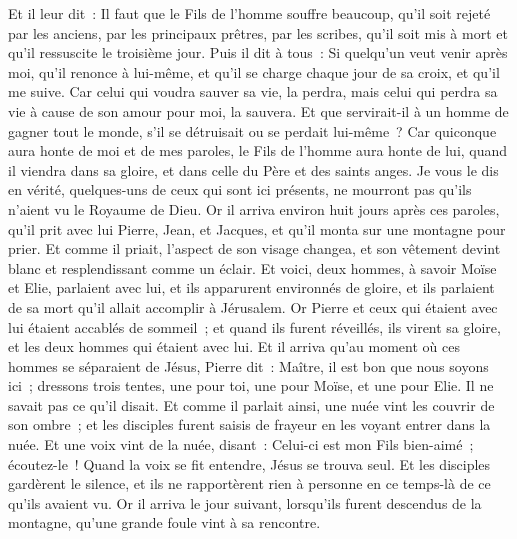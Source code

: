 \begin{multicols}{2}
Et il leur dit~: Il faut que le Fils de l'homme souffre beaucoup, qu'il soit rejeté par les anciens, par les principaux prêtres, par les scribes, qu'il soit mis à mort et qu'il ressuscite le troisième jour.
Puis il dit à tous~: Si quelqu'un veut venir après moi, qu'il renonce à lui-même, et qu'il se charge chaque jour de sa croix, et qu'il me suive.
Car celui qui voudra sauver sa vie, la perdra, mais celui qui perdra sa vie à cause de son amour pour moi, la sauvera.
Et que servirait-il à un homme de gagner tout le monde, s'il se détruisait ou se perdait lui-même~?
Car quiconque aura honte de moi et de mes paroles, le Fils de l'homme aura honte de lui, quand il viendra dans sa gloire, et dans celle du Père et des saints anges.
Je vous le dis en vérité, quelques-uns de ceux qui sont ici présents, ne mourront pas qu'ils n'aient vu le Royaume de Dieu.
Or il arriva environ huit jours après ces paroles, qu'il prit avec lui Pierre, Jean, et Jacques, et qu'il monta sur une montagne pour prier.
Et comme il priait, l'aspect de son visage changea, et son vêtement devint blanc et resplendissant comme un éclair.
Et voici, deux hommes, à savoir Moïse et Elie, parlaient avec lui,
et ils apparurent environnés de gloire, et ils parlaient de sa mort qu'il allait accomplir à Jérusalem.
Or Pierre et ceux qui étaient avec lui étaient accablés de sommeil~; et quand ils furent réveillés, ils virent sa gloire, et les deux hommes qui étaient avec lui.
Et il arriva qu'au moment où ces hommes se séparaient de Jésus, Pierre dit~: Maître, il est bon que nous soyons ici~; dressons trois tentes, une pour toi, une pour Moïse, et une pour Elie. Il ne savait pas ce qu'il disait.
Et comme il parlait ainsi, une nuée vint les couvrir de son ombre~; et les disciples furent saisis de frayeur en les voyant entrer dans la nuée.
Et une voix vint de la nuée, disant~: Celui-ci est mon Fils bien-aimé~; écoutez-le~!
Quand la voix se fit entendre, Jésus se trouva seul. Et les disciples gardèrent le silence, et ils ne rapportèrent rien à personne en ce temps-là de ce qu'ils avaient vu.
Or il arriva le jour suivant, lorsqu'ils furent descendus de la montagne, qu'une grande foule vint à sa rencontre.

\end{multicols}

